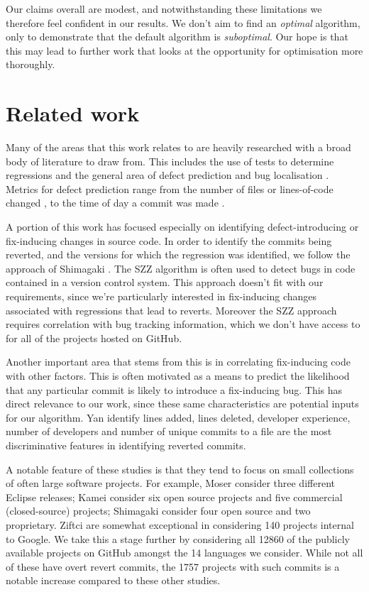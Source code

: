 \documentclass[10pt,journal,compsoc]{IEEEtran}
\begin{document}
Our claims overall are modest, and notwithstanding these limitations we therefore feel confident in our results. We don't aim to find an {\it optimal\/} algorithm, only to demonstrate that the default algorithm is {\it suboptimal}. Our hope is that this may lead to further work that looks at the opportunity for optimisation more thoroughly.

\section{Related work}

Many of the areas that this work relates to are heavily researched with a broad body of literature to draw from. This includes the use of tests to determine regressions and the general area of defect prediction and bug localisation \cite{kamei2013, shimagaki2016, yan2019}. Metrics for defect prediction range from the number of files or lines-of-code changed \cite{moser2008}, to the time of day a commit was made \cite{eyolfson2011}.

A portion of this work has focused especially on identifying defect-introducing or fix-inducing changes in source code. In order to identify the commits being reverted, and the versions for which the regression was identified, we follow the approach of Shimagaki \etal \cite{shimagaki2016}. The SZZ algorithm \cite{sliwerski2005} is often used to detect bugs in code contained in a version control system. This approach doesn't fit with our requirements, since we're particularly interested in fix-inducing changes associated with regressions that lead to reverts. Moreover the SZZ approach requires correlation with bug tracking information, which we don't have access to for all of the projects hosted on GitHub.

Another important area that stems from this is in correlating fix-inducing code with other factors. This is often motivated as a means to predict the likelihood that any particular commit is likely to introduce a fix-inducing bug. This has direct relevance to our work, since these same characteristics are potential inputs for our algorithm. Yan \etal \cite{yan2019} identify lines added, lines deleted, developer experience, number of developers and number of unique commits to a file are the most discriminative features in identifying reverted commits.

A notable feature of these studies is that they tend to focus on small collections of often large software projects. For example, Moser \etal \cite{moser2008} consider three different Eclipse releases; Kamei \etal \cite{kamei2013} consider six open source projects and five commercial (closed-source) projects; Shimagaki \etal \cite{shimagaki2016} consider four open source and two proprietary. Ziftci \etal \cite{ziftci2013, ziftci2017} are somewhat exceptional in considering 140 projects internal to Google. We take this a stage further by considering all 12860 of the publicly available projects on GitHub amongst the 14 languages we consider. While not all of these have overt revert commits, the 1757 projects with such commits is a notable increase compared to these other studies.
\end{document}
